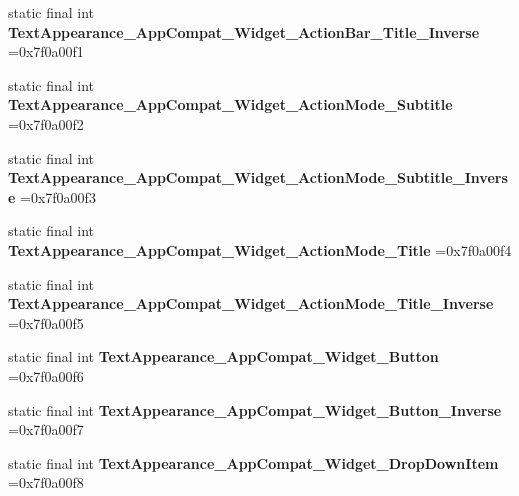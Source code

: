 \begin{DoxyCompactItemize}
static final int {\bfseries Text\+Appearance\+\_\+\+App\+Compat\+\_\+\+Widget\+\_\+\+Action\+Bar\+\_\+\+Title\+\_\+\+Inverse} =0x7f0a00f1
\item 
\mbox{\label{classproject4_1_1xaria_1_1R_1_1style_a79f573657e311c0f1614dc96ec7f455d}} 
static final int {\bfseries Text\+Appearance\+\_\+\+App\+Compat\+\_\+\+Widget\+\_\+\+Action\+Mode\+\_\+\+Subtitle} =0x7f0a00f2
\item 
\mbox{\label{classproject4_1_1xaria_1_1R_1_1style_a36f83d46889d0edef2fa53cb5cde16f6}} 
static final int {\bfseries Text\+Appearance\+\_\+\+App\+Compat\+\_\+\+Widget\+\_\+\+Action\+Mode\+\_\+\+Subtitle\+\_\+\+Inverse} =0x7f0a00f3
\item 
\mbox{\label{classproject4_1_1xaria_1_1R_1_1style_ad20efe7c9b7ba5e087372a203d7b8a5f}} 
static final int {\bfseries Text\+Appearance\+\_\+\+App\+Compat\+\_\+\+Widget\+\_\+\+Action\+Mode\+\_\+\+Title} =0x7f0a00f4
\item 
\mbox{\label{classproject4_1_1xaria_1_1R_1_1style_a2b7f21114e8271c49d073ba34969a2ff}} 
static final int {\bfseries Text\+Appearance\+\_\+\+App\+Compat\+\_\+\+Widget\+\_\+\+Action\+Mode\+\_\+\+Title\+\_\+\+Inverse} =0x7f0a00f5
\item 
\mbox{\label{classproject4_1_1xaria_1_1R_1_1style_aae716187fcafa73a195fd5f7db04ccfb}} 
static final int {\bfseries Text\+Appearance\+\_\+\+App\+Compat\+\_\+\+Widget\+\_\+\+Button} =0x7f0a00f6
\item 
\mbox{\label{classproject4_1_1xaria_1_1R_1_1style_a7c695161a2952284de52a4a8cb555a57}} 
static final int {\bfseries Text\+Appearance\+\_\+\+App\+Compat\+\_\+\+Widget\+\_\+\+Button\+\_\+\+Inverse} =0x7f0a00f7
\item 
\mbox{\label{classproject4_1_1xaria_1_1R_1_1style_a01f74204b75429c7e99b4ad12e194487}} 
static final int {\bfseries Text\+Appearance\+\_\+\+App\+Compat\+\_\+\+Widget\+\_\+\+Drop\+Down\+Item} =0x7f0a00f8
\item 
\mbox{\label{classproject4_1_1xaria_1_1R_1_1style_a44f02840978fce5d33075482ce9fc297}} 

\end{DoxyCompactItemize}
